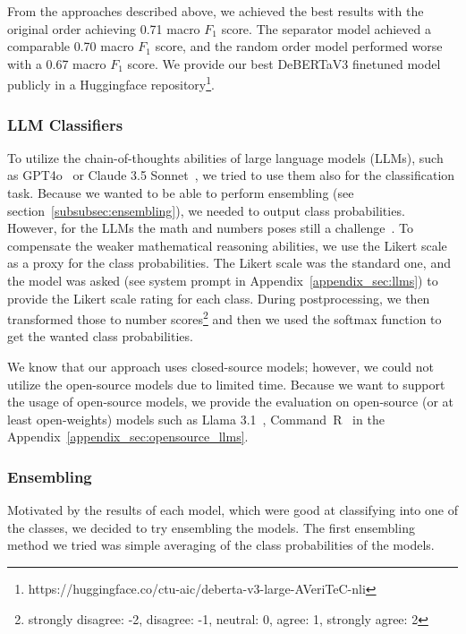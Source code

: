 From the approaches described above, we achieved the best results with the original order achieving 0.71 macro $F_1$ score. The separator model achieved a comparable 0.70 macro $F_1$ score, and the random order model performed worse with a 0.67 macro $F_1$ score. We provide our best DeBERTaV3 finetuned model publicly in a Huggingface repository\footnote{https://huggingface.co/ctu-aic/deberta-v3-large-AVeriTeC-nli}.

\subsubsection*{LLM Classifiers}
To utilize the chain-of-thoughts abilities of large language models (LLMs), such as GPT4o~\cite{openai2024gpt4o} or Claude 3.5 Sonnet~\cite{anthropic2024claude35sonnet}, we tried to use them also for the classification task. Because we wanted to be able to perform ensembling (see section~\ref{subsubsec:ensembling}), we needed to output class probabilities. However, for the LLMs the math and numbers poses still a challenge~\cite{ahn-etal-2024-large}. To compensate the weaker mathematical reasoning abilities, we use the Likert scale as a proxy for the class probabilities. The Likert scale was the standard one, and the model was asked (see system prompt in Appendix~\ref{appendix_sec:llms}) to provide the Likert scale rating for each class. During postprocessing, we then transformed those to number scores\footnote{strongly disagree: -2, disagree: -1, neutral: 0, agree: 1, strongly agree: 2} and then we used the softmax function to get the wanted class probabilities.

We know that our approach uses closed-source models; however, we could not utilize the open-source models due to limited time. Because we want to support the usage of open-source models, we provide the evaluation on open-source (or at least open-weights) models such as Llama 3.1~\cite{meta2024llama31}, Command~R~\cite{cohere2024commandr} in the Appendix~\ref{appendix_sec:opensource_llms}.

\subsubsection*{Ensembling}
\label{subsubsec:ensembling}

Motivated by the results of each model, which were good at classifying into one of the classes, we decided to try ensembling the models. The first ensembling method we tried was simple averaging of the class probabilities of the models.

